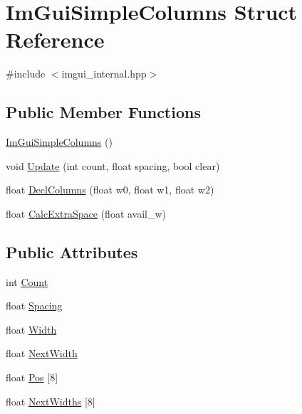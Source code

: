 \hypertarget{struct_im_gui_simple_columns}{}\section{Im\+Gui\+Simple\+Columns Struct Reference}
\label{struct_im_gui_simple_columns}


{\ttfamily \#include $<$imgui\+\_\+internal.\+hpp$>$}

\subsection*{Public Member Functions}
\begin{DoxyCompactItemize}
\item 
\hyperlink{struct_im_gui_simple_columns_ac299fa0dc0a471dc8ee3a9f97a67e444}{Im\+Gui\+Simple\+Columns} ()
\item 
void \hyperlink{struct_im_gui_simple_columns_a189662e328df2bf6947d9ab292f8ed21}{Update} (int count, float spacing, bool clear)
\item 
float \hyperlink{struct_im_gui_simple_columns_a2daac4e4973ea1e9f2dda655206796fc}{Decl\+Columns} (float w0, float w1, float w2)
\item 
float \hyperlink{struct_im_gui_simple_columns_aeebfea369d5f37b99f02ecd9ab2187ee}{Calc\+Extra\+Space} (float avail\+\_\+w)
\end{DoxyCompactItemize}
\subsection*{Public Attributes}
\begin{DoxyCompactItemize}
\item 
int \hyperlink{struct_im_gui_simple_columns_ac5fdbd35f74c31992c95fc4b759e9c2f}{Count}
\item 
float \hyperlink{struct_im_gui_simple_columns_aee2a43067de182ca1aa1447c8b658935}{Spacing}
\item 
float \hyperlink{struct_im_gui_simple_columns_a3b7ed6f3aa04e3ead1ea17e4d9f92767}{Width}
\item 
float \hyperlink{struct_im_gui_simple_columns_afa5623a5d27aadeb8c08d925b189397e}{Next\+Width}
\item 
float \hyperlink{struct_im_gui_simple_columns_a3c13060fe3e4732512a663bb369f51d8}{Pos} \mbox{[}8\mbox{]}
\item 
float \hyperlink{struct_im_gui_simple_columns_a5d2739196dc2df8626e32a0e373cdffe}{Next\+Widths} \mbox{[}8\mbox{]}
\end{DoxyCompactItemize}


